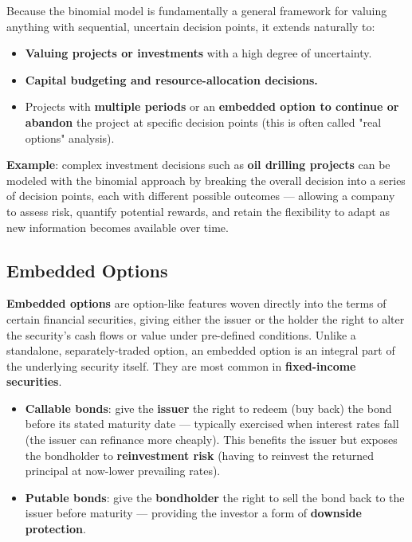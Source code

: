 \documentclass[12pt,openany]{book}
\theoremstyle{definition}
\theoremstyle{remark}
\begin{document}
Because the binomial model is fundamentally a general framework for valuing anything with sequential, uncertain decision points, it extends naturally to:
\begin{itemize}
\item \textbf{Valuing projects or investments} with a high degree of uncertainty.
\item \textbf{Capital budgeting and resource-allocation decisions.}
\item Projects with \textbf{multiple periods} or an \textbf{embedded option to continue or abandon} the project at specific decision points (this is often called "real options" analysis).
\end{itemize}
\textbf{Example}: complex investment decisions such as \textbf{oil drilling projects} can be modeled with the binomial approach by breaking the overall decision into a series of decision points, each with different possible outcomes — allowing a company to assess risk, quantify potential rewards, and retain the flexibility to adapt as new information becomes available over time.

\subsection{Embedded Options}

\textbf{Embedded options} are option-like features woven directly into the terms of certain financial securities, giving either the issuer or the holder the right to alter the security's cash flows or value under pre-defined conditions. Unlike a standalone, separately-traded option, an embedded option is an integral part of the underlying security itself. They are most common in \textbf{fixed-income securities}.

\begin{itemize}
\item \textbf{Callable bonds}: give the \textbf{issuer} the right to redeem (buy back) the bond before its stated maturity date — typically exercised when interest rates fall (the issuer can refinance more cheaply). This benefits the issuer but exposes the bondholder to \textbf{reinvestment risk} (having to reinvest the returned principal at now-lower prevailing rates).
\item \textbf{Putable bonds}: give the \textbf{bondholder} the right to sell the bond back to the issuer before maturity — providing the investor a form of \textbf{downside protection}.
\end{itemize}
\end{document}
